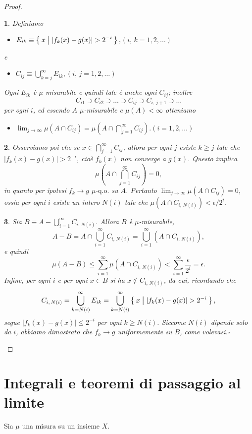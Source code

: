 \documentclass[a4paper,10pt,openright,oneside]{book}
\theoremstyle{theoremstyle}
\theoremstyle{theoremstylewoheader}
\theoremstyle{theoremstyle}
\theoremstyle{proofsecstyle}
\newtheorem{proofsec}{}
\theoremstyle{nonumberplain}
\newtheorem{proof}{Dim.}
\newcommand{\abs}[1]{\ensuremath{\lvert #1 \rvert}}
\newcommand{\qo}[1]{\ensuremath{#1\text{-q.o.}}}
\renewcommand{\qedsymbol}{\ensuremath{\square}}
\newcommand{\qed}{\unskip\nobreak\hfill\nobreak\hspace{.5em}\qedsymbol}
\newcommand{\mymath}[2]{\begin{itemize}%
  \item[]\hfill\hbox{}\ensuremath{\displaystyle #1}\hfill\ensuremath{\displaystyle #2}%
  \end{itemize}}
\begin{document}
\begin{proof}
\begin{proofsec}
Definiamo \mymath{E_{ik} \equiv \Set{ x | \abs{f_k(x) - g(x)} > 2^{-i} },}{(i,\, k = 1, 2, \ldots)} e \mymath{C_{ij} \equiv \bigcup_{k=j}^\infty E_{ik},}{(i,\, j = 1, 2, \ldots)} Ogni $E_{ik}$ è $\mu$-misurabile e quindi tale è anche ogni $C_{ij}$; inoltre
\[
C_{i1} \supset C_{i2} \supset \ldots \supset C_{ij} \supset C_{i,\,j+1} \supset \ldots
\]
per ogni $i$, ed essendo $A$ $\mu$-misurabile e $\mu(A) < \infty$ otteniamo \mymath{\lim_{j \to \infty} \mu(A \cap C_{ij}) = \mu\left(A \cap \bigcap_{j=1}^\infty C_{ij}\right).}{(i = 1, 2, \ldots)}
\end{proofsec}

\begin{proofsec}
Osserviamo poi che se $x \in \bigcap_{j=1}^\infty C_{ij}$, allora per ogni $j$ esiste $k \ge j$ tale che $\abs{f_k(x) - g(x)} > 2^{-i}$, cioè $f_k(x)$ \emph{non} converge a $g(x)$. Questo implica
\[
\mu\left(A \cap \bigcap_{j=1}^\infty C_{ij}\right) = 0,
\]
in quanto per ipotesi $f_k \to g$ $\qo{\mu}$ su $A$. Pertanto $\lim_{j \to \infty} \mu(A \cap C_{ij}) = 0$, ossia per ogni $i$ esiste un intero $N(i)$ tale che $\mu(A \cap C_{i,\,N(i)}) < \epsilon/2^i$.
\end{proofsec}

\begin{proofsec}
Sia $B \equiv A - \bigcup_{i=1}^\infty C_{i,\,N(i)}$. Allora $B$ è $\mu$-misurabile,
\[
A - B = A \cap \bigcup_{i=1}^\infty C_{i,\,N(i)} = \bigcup_{i=1}^\infty (A \cap C_{i,\,N(i)}),
\]
e quindi
\[
\mu(A - B) \le \sum_{i=1}^\infty \mu(A \cap C_{i,\, N(i)}) < \sum_{i=1}^\infty \frac{\epsilon}{2^i} = \epsilon.
\]
Infine, per ogni $i$ e per ogni $x \in B$ si ha $x \notin C_{i,\, N(i)}$, da cui, ricordando che
\[
C_{i,\, N(i)} = \bigcup_{k=N(i)}^\infty E_{ik} = \bigcup_{k=N(i)}^\infty \Set{ x | \abs{f_k(x) - g(x)} > 2^{-i} },
\]
segue $\abs{f_k(x) - g(x)} \le 2^{-i}$ per ogni $k \ge N(i)$. Siccome $N(i)$ dipende solo da $i$, abbiamo dimostrato che $f_k \to g$ uniformemente su $B$, come volevasi.\qed
\end{proofsec}
\end{proof}

\section{Integrali e teoremi di passaggio al limite}

Sia $\mu$ una misura su un insieme $X$.
\end{document}
